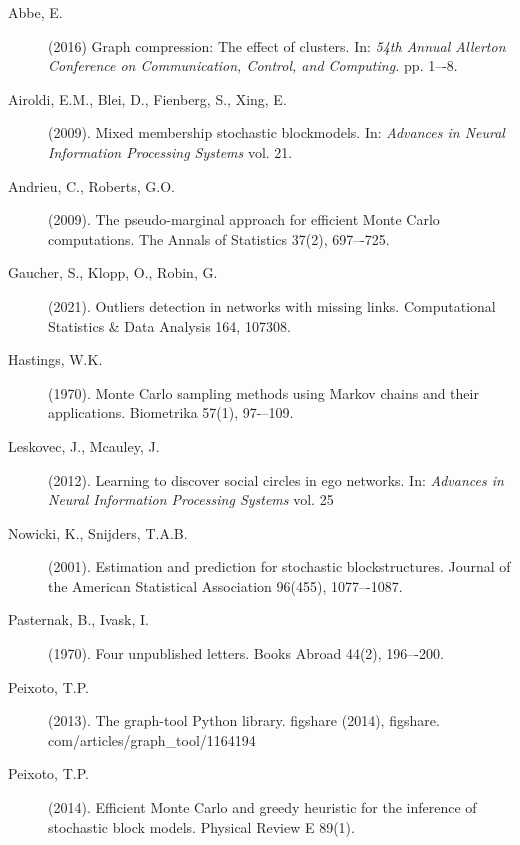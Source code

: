 
\begin{description}

	\item[Abbe, E.] (2016) Graph compression: The effect of clusters.
	In: {\it 54th Annual Allerton Conference on Communication, Control, and Computing.} pp. 1–-8.
	
	\item[Airoldi, E.M., Blei, D., Fienberg, S., Xing, E.] (2009).
	Mixed membership stochastic blockmodels. 
	In: {\it Advances in Neural Information Processing Systems} vol. 21.

	\item[Andrieu, C., Roberts, G.O.] (2009). 
	The pseudo-marginal approach for efficient Monte Carlo computations.
	The Annals of Statistics 37(2), 697–-725.

	\item[Gaucher, S., Klopp, O., Robin, G.] (2021).
	Outliers detection in networks with missing links.
	Computational Statistics \& Data Analysis 164, 107308.

	\item[Hastings, W.K.] (1970).
	Monte Carlo sampling methods using Markov chains and their applications.
	Biometrika 57(1), 97-–109.

	\item[Leskovec, J., Mcauley, J.] (2012).
	Learning to discover social circles in ego networks.
	In: {\it Advances in Neural Information Processing Systems} vol. 25

	\item[Nowicki, K., Snijders, T.A.B.] (2001).
	Estimation and prediction for stochastic blockstructures. 
	Journal of the American Statistical Association 96(455), 1077–-1087.

	\item[Pasternak, B., Ivask, I.] (1970).
	Four unpublished letters. Books Abroad 44(2), 196–-200.

	\item[Peixoto, T.P.] (2013).
	The graph-tool Python library. figshare (2014), figshare. com/articles/graph\_tool/1164194
	
	\item[Peixoto, T.P.] (2014).
	Efficient Monte Carlo and greedy heuristic for the inference of stochastic block models.
	Physical Review E 89(1).


\end{description}
